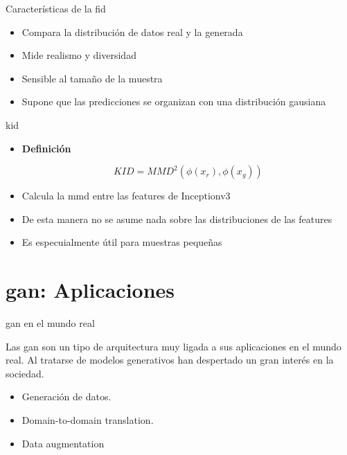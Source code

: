 \begin{frame}{Características de la \gls{fid} \cite{heusel2017gans}}
\begin{itemize}
    \item Compara la \alert{distribución de datos real} y la \alert{generada}
    \item Mide \alert{realismo y diversidad}
    \item Sensible al tamaño de la muestra
    \item Supone que las predicciones se organizan con una \alert{distribución gausiana}
\end{itemize}
\end{frame}

\begin{frame}{\gls{kid} \cite{binkowski2018demystifying}}
\begin{itemize}
    \item \alert{\textbf{Definición}}

    \begin{equation}
        KID=MMD^2(\phi(x_r),\phi(x_g))
    \end{equation}
    
    \item Calcula la \gls{mmd} entre las features de Inceptionv3
    \item De esta manera no se \alert{asume} nada sobre las distribuciones de las features
    \item Es especuialmente útil para muestras pequeñas
\end{itemize}
\end{frame}

\section{\gls{gan}: Aplicaciones}

\begin{frame}{\gls{gan} en el mundo real}

    Las \alert{\gls{gan}} son un tipo de arquitectura muy ligada a sus \alert{aplicaciones en el mundo real}. Al tratarse de \alert{modelos generativos} han despertado un gran interés en la sociedad.
    
    \begin{itemize}
        \item Generación de datos.
        \item Domain-to-domain translation.
        \item Data augmentation
    \end{itemize}
\end{frame}

